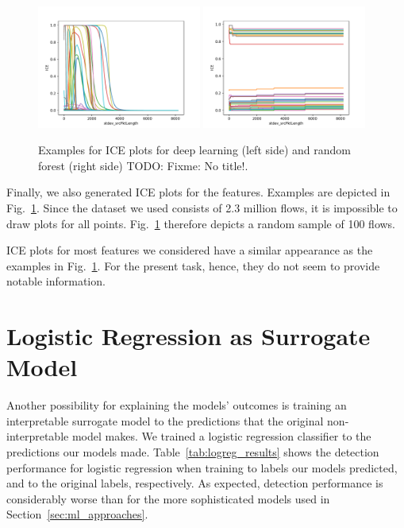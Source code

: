 \documentclass[10pt,sigconf,letterpaper]{acmart}
\newcommand\note[2]{{\color{#1}#2}}
\newcommand\todo[1]{{\note{red}{TODO: #1}}}
\begin{document}
\begin{figure}[p]
\includegraphics[width=0.48\textwidth]{../ice/apply(stdev(ipTotalLength),forward)_nn.pdf}
\includegraphics[width=0.48\textwidth]{../ice/apply(stdev(ipTotalLength),forward)_rf.pdf}

\caption{Examples for ICE plots for deep learning (left side) and random forest (right side) \todo{Fixme: No title!}.}
\label{fig:ice}
\end{figure}

Finally, we also generated ICE plots for the features. Examples are depicted in Fig.~\ref{fig:ice}. Since the dataset we used consists of 2.3 million flows, it is impossible to draw plots for all points. Fig.~\ref{fig:ice} therefore depicts a random sample of 100 flows.

ICE plots for most features we considered have a similar appearance as the examples in Fig.~\ref{fig:ice}. For the present task, hence, they do not seem to provide notable information.

\section{Logistic Regression as Surrogate Model}
Another possibility for explaining the models' outcomes is training an interpretable surrogate model to the predictions that the original non-interpretable model makes. We trained a logistic regression classifier to the predictions our models made. Table~\ref{tab:logreg_results} shows the detection performance for logistic regression when training to labels our models predicted, and to the original labels, respectively. As expected, detection performance is considerably worse than for the more sophisticated models used in Section~\ref{sec:ml_approaches}.
\end{document}
